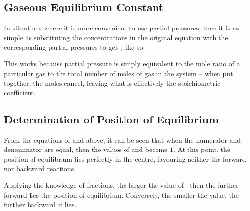 		\subsection{Gaseous Equilibrium Constant \texorpdfstring{\Kp{}}{Kp}}

			In situations where it is more convenient to use partial pressures, then it is as simple as substituting the concentrations
			in the original \Kc{} equation with the corresponding partial pressures to get \Kp{}, like so:

			\mathdiagram{
				\[ K_{p} = \frac{(P_{C})^{c}(P_{D})^{d}}{(P_{A})^{a}(P_{B})^{b}} \]
			}

			This works because partial pressure is simply equivalent to the mole ratio of a particular gas to the total number of
			moles of gas in the system -- when put together, the moles cancel, leaving what is effectively the stoichiometric
			coefficient.



		\pagebreak
		\subsection{Determination of Position of Equilibrium}

			From the equations of \Kc{} and \Kp{} above, it can be seen that when the numerator and denominator are equal, then the values of
			\Kc{} and \Kp{} become $1$. At this point, the position of equilibrium lies perfectly in the centre, favouring neither the forward
			nor backward reactions.

			Applying the knowledge of fractions, the larger the value of \Kc{}, then the further forward lies the position of equilibrium.
			Conversely, the smaller the value, the further backward it lies.


